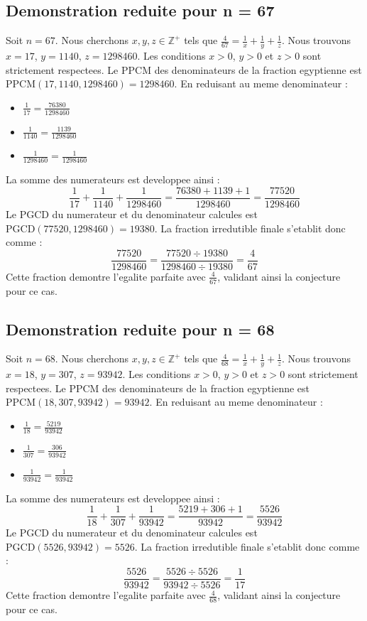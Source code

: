 \documentclass[11pt,a4paper]{article}
\begin{document}
\subsection{Demonstration reduite pour n = 67}
Soit $n = 67$. Nous cherchons $x, y, z \in \mathbb{Z}^{+}$ tels que $\frac{4}{67} = \frac{1}{x} + \frac{1}{y} + \frac{1}{z}$.
Nous trouvons $x = 17$, $y = 1140$, $z = 1298460$.
Les conditions $x > 0$, $y > 0$ et $z > 0$ sont strictement respectees.
Le PPCM des denominateurs de la fraction egyptienne est $\text{PPCM}(17, 1140, 1298460) = 1298460$.
En reduisant au meme denominateur :
\begin{itemize}
    \item $\frac{1}{17} = \frac{76380}{1298460}$
    \item $\frac{1}{1140} = \frac{1139}{1298460}$
    \item $\frac{1}{1298460} = \frac{1}{1298460}$
\end{itemize}
La somme des numerateurs est developpee ainsi :
$$ \frac{1}{17} + \frac{1}{1140} + \frac{1}{1298460} = \frac{76380 + 1139 + 1}{1298460} = \frac{77520}{1298460} $$
Le PGCD du numerateur et du denominateur calcules est $\text{PGCD}(77520, 1298460) = 19380$.
La fraction irredutible finale s'etablit donc comme :
$$ \frac{77520}{1298460} = \frac{77520 \div 19380}{1298460 \div 19380} = \frac{4}{67} $$
Cette fraction demontre l'egalite parfaite avec $\frac{4}{67}$, validant ainsi la conjecture pour ce cas.

\subsection{Demonstration reduite pour n = 68}
Soit $n = 68$. Nous cherchons $x, y, z \in \mathbb{Z}^{+}$ tels que $\frac{4}{68} = \frac{1}{x} + \frac{1}{y} + \frac{1}{z}$.
Nous trouvons $x = 18$, $y = 307$, $z = 93942$.
Les conditions $x > 0$, $y > 0$ et $z > 0$ sont strictement respectees.
Le PPCM des denominateurs de la fraction egyptienne est $\text{PPCM}(18, 307, 93942) = 93942$.
En reduisant au meme denominateur :
\begin{itemize}
    \item $\frac{1}{18} = \frac{5219}{93942}$
    \item $\frac{1}{307} = \frac{306}{93942}$
    \item $\frac{1}{93942} = \frac{1}{93942}$
\end{itemize}
La somme des numerateurs est developpee ainsi :
$$ \frac{1}{18} + \frac{1}{307} + \frac{1}{93942} = \frac{5219 + 306 + 1}{93942} = \frac{5526}{93942} $$
Le PGCD du numerateur et du denominateur calcules est $\text{PGCD}(5526, 93942) = 5526$.
La fraction irredutible finale s'etablit donc comme :
$$ \frac{5526}{93942} = \frac{5526 \div 5526}{93942 \div 5526} = \frac{1}{17} $$
Cette fraction demontre l'egalite parfaite avec $\frac{4}{68}$, validant ainsi la conjecture pour ce cas.
\end{document}
